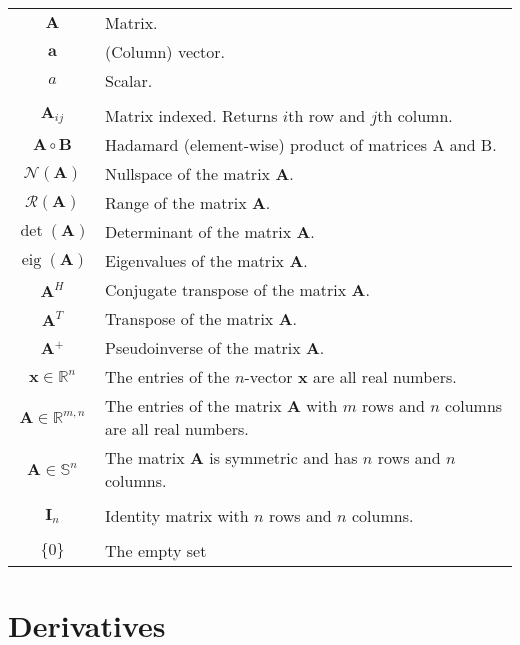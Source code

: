 \documentclass{book}
\newcommand{\mA}{\mathbf{A}}
\newcommand{\mB}{\mathbf{B}}
\newcommand{\mI}{\mathbf{I}}
\newcommand{\va}{\mathbf{a}}
\newcommand{\vx}{\mathbf{x}}
\DeclareMathOperator{\eig}{eig}
\newcommand{\sRn}{\mathbb{R}^{n}}
\newcommand{\sRmn}{\mathbb{R}^{m,n}}
\newcommand{\sSn}{\mathbb{S}^{n}}
\newcommand{\pinv}{\!^+}
\newcommand{\ns}{\mathcal{N}}
\newcommand{\range}{\mathcal{R}}
\begin{document}
\begin{tabular}{cl}
$\mA$                   & Matrix.                                                   \\
$\va$                   & (Column) vector.                                          \\
$a$                     & Scalar.                                                   \\
& \\
$\mA_{ij}$              & Matrix indexed. Returns $i$th row and $j$th column.       \\
$\mA\circ \mB$          & Hadamard (element-wise) product of matrices A and B.      \\
$\ns(\mA)$              & Nullspace of the matrix $\mA$.                            \\
$\range(\mA)$           & Range of the matrix $\mA$.                                \\
$\det(\mA)$             & Determinant of the matrix $\mA$.                          \\
$\eig(\mA)$             & Eigenvalues of the matrix $\mA$.                          \\
$\mA^H$                 & Conjugate transpose of the matrix $\mA$.                  \\
$\mA^T$                 & Transpose of the matrix $\mA$.                            \\
$\mA\pinv$              & Pseudoinverse of the matrix $\mA$.                        \\
$\vx\in\sRn$            & The entries of the $n$-vector $\vx$ are all real numbers. \\
$\mA\in\sRmn$           & The entries of the matrix $\mA$ with $m$ rows and $n$ columns are all real numbers. \\
$\mA\in\sSn$            & The matrix $\mA$ is symmetric and has $n$ rows and $n$ columns. \\
& \\
$\mI_n$                 & Identity matrix with $n$ rows and $n$ columns.            \\
& \\
$\{0\}$                 & The empty set
\end{tabular}

\chapter{Derivatives}
\end{document}
